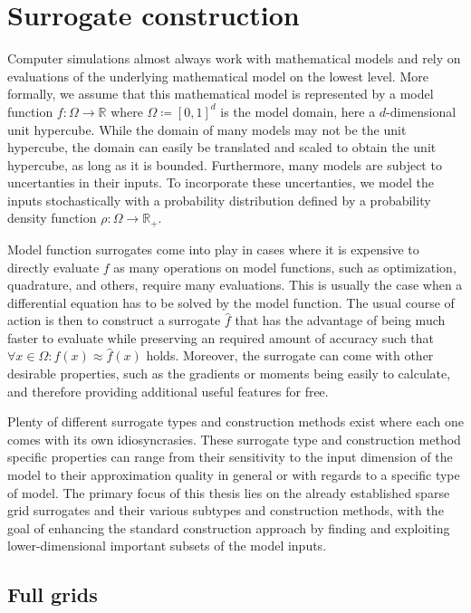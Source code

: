 \documentclass[
  a4paper,  %
  twoside,  %
  bibliography=totoc,
  headsepline,
  cleardoublepage=empty,
  parskip=half,
  draft=false
]{scrbook}
\begin{document}
\chapter{Surrogate construction}
\label{chap:c2}

Computer simulations almost always work with mathematical models and rely on evaluations of the underlying mathematical model on the lowest level.
More formally, we assume that this mathematical model is represented by a model function $f \colon \Omega \to \mathds{R}$ where $\Omega \coloneqq [0,1]^d$ is the model domain, here a $d$-dimensional unit hypercube.
While the domain of many models may not be the unit hypercube, the domain can easily be translated and scaled to obtain the unit hypercube, as long as it is bounded.
Furthermore, many models are subject to uncertanties in their inputs.
To incorporate these uncertanties, we model the inputs stochastically with a probability distribution defined by a probability density function $\rho \colon \Omega \to \mathds{R_+}$.

Model function surrogates come into play in cases where it is expensive to directly evaluate $f$ as many operations on model functions, such as optimization, quadrature, and others, require many evaluations.
This is usually the case when a differential equation has to be solved by the model function.
The usual course of action is then to construct a surrogate $\hat{f}$ that has the advantage of being much faster to evaluate while preserving an required amount of accuracy such that $\forall x \in \Omega \colon f(x) \approx \hat{f}(x)$ holds.
Moreover, the surrogate can come with other desirable properties, such as the gradients or moments being easily to calculate, and therefore providing additional useful features for free.

Plenty of different surrogate types and construction methods exist where each one comes with its own idiosyncrasies.
These surrogate type and construction method specific properties can range from their sensitivity to the input dimension of the model to their approximation quality in general or with regards to a specific type of model. 
The primary focus of this thesis lies on the already established sparse grid surrogates and their various subtypes and construction methods, with the goal of enhancing the standard construction approach by finding and exploiting lower-dimensional important subsets of the model inputs.

\section{Full grids}
\end{document}
